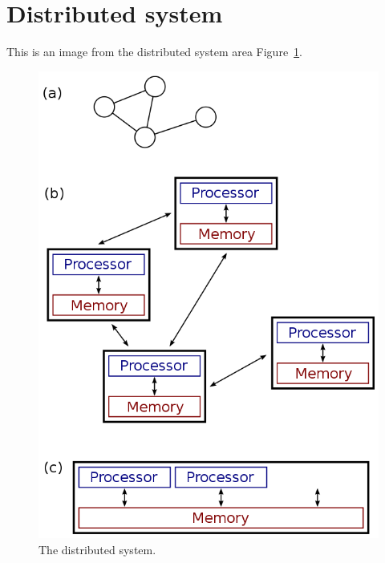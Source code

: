 \section{Distributed system}

This is an image from the distributed system area Figure~\ref{fig:ds}.

  \begin{figure}
    \centering
	\includegraphics[width=1\linewidth]{dist.png}
	\caption{\textmd{The distributed system}.}\label{fig:ds}
  \end{figure}
